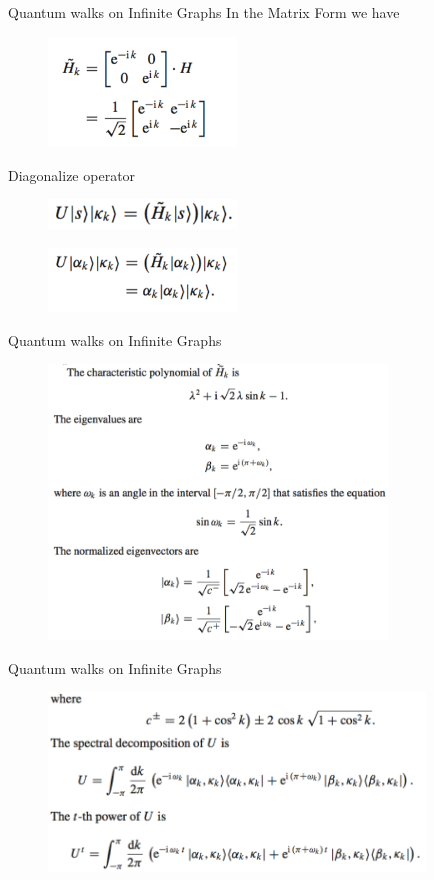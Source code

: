 \documentclass[xcolor=svgnames]{beamer}
\begin{document}
\begin{frame}{Quantum walks on Infinite Graphs}
In the Matrix Form we have
\begin{figure}
    \includegraphics[width = 5cm]{H_k_Matrix.png}
\end{figure}
Diagonalize operator
    \begin{figure}
        \includegraphics[width = 5cm]{eigen.png}
    \end{figure}
     \begin{figure}
        \includegraphics[width = 5cm]{eigen2.png}
    \end{figure}
\end{frame}

\begin{frame}{Quantum walks on Infinite Graphs}
\begin{figure}
    \includegraphics[width = 9cm]{eigen3.png}
\end{figure}
    
\end{frame}

\begin{frame}{Quantum walks on Infinite Graphs}
\begin{figure}
    \includegraphics[width = 10cm]{spectral.png}
\end{figure}
    
\end{frame}
\end{document}
